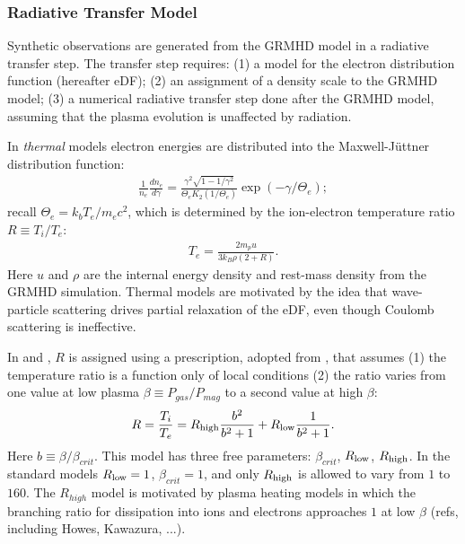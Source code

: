 \subsubsection{Radiative Transfer Model}

Synthetic observations are generated from the GRMHD model in a radiative transfer step.  The transfer step requires: (1) a model for the electron distribution function (hereafter eDF); (2) an assignment of a density scale to the GRMHD model; (3) a numerical radiative transfer step done after the GRMHD model, assuming that the plasma evolution is unaffected by radiation.


In {\it thermal} models electron energies are distributed into the Maxwell-J{\"u}ttner distribution function:
\begin{align}
\frac{1}{n_e}\frac{dn_e}{d\gamma}= \frac{\gamma^2 \sqrt{1-1/\gamma^2}} {\Theta_e K_2(1/\Theta_e)} \exp (-\gamma/\Theta_e);
\end{align}
recall $\Theta_e=k_b T_e/m_e c^2$, which is determined by the ion-electron temperature ratio $R \equiv T_i/T_e$:
\begin{align}
T_e=\frac{2 m_p u}{3 k_B \rho (2+R)}.
\end{align}
Here $u$ and $\rho$ are the internal energy density and rest-mass density from the GRMHD simulation.  Thermal models are motivated by the idea that wave-particle scattering drives partial relaxation of the eDF, even though Coulomb scattering is ineffective.

In \cite{M87PaperV} and \cite{M87PaperVIII}, $R$ is assigned using a prescription, adopted from \cite{2016A&A...586A..38M}, that assumes (1) the temperature ratio is a function only of local conditions (2) the ratio varies from one value at low plasma $\beta \equiv P_{gas}/P_{mag}$ to a second value at high $\beta$:
\begin{equation}
R = \frac{T_i}{T_e} = R_{\rm high} \frac{b^2}{b^2+1} + R_{\rm low} \frac{1}{b^2+1}.
\end{equation}
Here $b \equiv \beta/\beta_{crit}$. This model has three free parameters: $\beta_{crit}$, $R_{\rm low}$, $R_{\rm high}$.  In the standard models $R_{\rm low} = 1$, $\beta_{crit} = 1$, and only $R_{\rm high}$ is allowed to vary from $1$ to $160$.  The $R_{high}$ model is motivated by plasma heating models in which the branching ratio for dissipation into ions and electrons approaches $1$ at low $\beta$ (refs, including Howes, Kawazura, ...).

